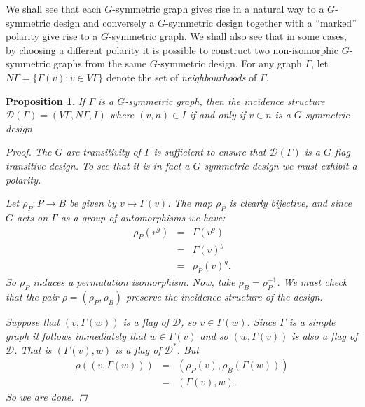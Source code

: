 \documentclass[12pt]{amsart}
\theoremstyle{plain}
\newtheorem{proposition}{Proposition}
\theoremstyle{definition}
\theoremstyle{remark}
\newcommand{\cD}{\mathcal{D}}
\begin{document}
We shall see that each $G$-symmetric graph 
gives rise in a natural way to a $G$-symmetric design 
and conversely a $G$-symmetric design together 
with a ``marked'' polarity give rise to a $G$-symmetric graph.
We shall also see that in some cases, by choosing a different
polarity it is possible to construct two non-isomorphic $G$-symmetric
graphs from the same $G$-symmetric design.
For any graph $\Gamma$, let $N \Gamma = \{ \Gamma(v) : v \in V \Gamma \}$
denote the set of {\it neighbourhoods} of $\Gamma$.

\begin{proposition}
If \/ $\Gamma$ is a $G$-symmetric graph,
then the incidence structure $\cD(\Gamma) = (V \Gamma, N \Gamma,I)$
where $(v,n) \in I$ if and only if $v \in n$ is a $G$-symmetric design
\begin{proof}
The $G$-arc transitivity of $\Gamma$ is sufficient to ensure
that $\cD(\Gamma)$ is a $G$-flag transitive design.
To see that it is in fact
a $G$-symmetric design we must exhibit a polarity.

Let $\rho_P : P \to B$ be given by $v \mapsto \Gamma(v)$.
The map $\rho_P$ is clearly bijective, and since $G$ acts on $\Gamma$
as a group of automorphisms we have:
\begin{eqnarray*}
\rho_P(v^g) & = & \Gamma(v^g) \\
            & = & \Gamma(v)^g \\
	    & = & \rho_P(v)^g.
\end{eqnarray*}
So $\rho_P$ induces a permutation isomorphism.
Now, take $\rho_B = \rho_P^{-1}$.
We must check that the pair $\rho = (\rho_P, \rho_B)$ preserve
the incidence structure of the design.

Suppose that $(v,\Gamma(w))$ is a flag of $\cD$, so $v \in \Gamma(w)$. 
Since $\Gamma$ is a simple graph it follows immediately that $w \in \Gamma(v)$
and so $(w, \Gamma(v))$ is also a flag of $\cD$.
That is $(\Gamma(v), w)$ is a flag of $\cD^{*}$.
But 
\begin{eqnarray*}
\rho((v, \Gamma(w))) & = & (\rho_P(v), \rho_B(\Gamma(w))) \\
                     & = & (\Gamma(v), w).
\end{eqnarray*}
So we are done.

\end{proof}
\end{proposition}
\end{document}
